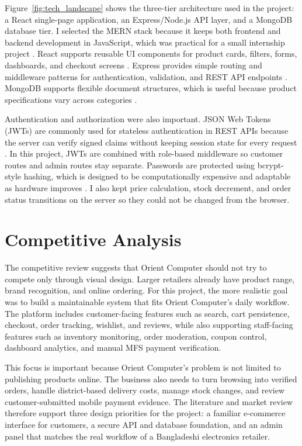 \documentclass[12pt,a4paper,oneside]{report}
\begin{document}
Figure~\ref{fig:tech_landscape} shows the three-tier architecture used in the project: a React single-page application, an Express/Node.js API layer, and a MongoDB database tier. I selected the MERN stack because it keeps both frontend and backend development in JavaScript, which was practical for a small internship project \cite{mern}. React supports reusable UI components for product cards, filters, forms, dashboards, and checkout screens \cite{react}. Express provides simple routing and middleware patterns for authentication, validation, and REST API endpoints \cite{express}. MongoDB supports flexible document structures, which is useful because product specifications vary across categories \cite{mongoose}.

Authentication and authorization were also important. JSON Web Tokens (JWTs) are commonly used for stateless authentication in REST APIs because the server can verify signed claims without keeping session state for every request \cite{jwt}. In this project, JWTs are combined with role-based middleware so customer routes and admin routes stay separate. Passwords are protected using bcrypt-style hashing, which is designed to be computationally expensive and adaptable as hardware improves \cite{bcrypt}. I also kept price calculation, stock decrement, and order status transitions on the server so they could not be changed from the browser.

\section{Competitive Analysis}
The competitive review suggests that Orient Computer should not try to compete only through visual design. Larger retailers already have product range, brand recognition, and online ordering. For this project, the more realistic goal was to build a maintainable system that fits Orient Computer's daily workflow. The platform includes customer-facing features such as search, cart persistence, checkout, order tracking, wishlist, and reviews, while also supporting staff-facing features such as inventory monitoring, order moderation, coupon control, dashboard analytics, and manual MFS payment verification.

This focus is important because Orient Computer's problem is not limited to publishing products online. The business also needs to turn browsing into verified orders, handle district-based delivery costs, manage stock changes, and review customer-submitted mobile payment evidence. The literature and market review therefore support three design priorities for the project: a familiar e-commerce interface for customers, a secure API and database foundation, and an admin panel that matches the real workflow of a Bangladeshi electronics retailer.
\end{document}
